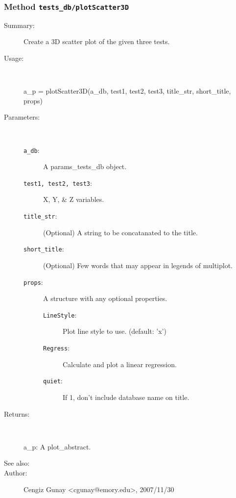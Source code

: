 \subsubsection[Method \texttt{plotScatter3D}]{Method \texttt{tests\_db/plotScatter3D}}%
%
\label{ref_tests_db__plotScatter3D}%
\hypertarget{ref_tests_db__plotScatter3D}{}%
\begin{description}
\item[Summary:]Create a 3D scatter plot of the given three tests.
%
\item[Usage:]~%
\begin{lyxcode}%
a\_p = plotScatter3D(a\_db, test1, test2, test3, title\_str, short\_title, props)
%
\end{lyxcode}%
%
%
\item[Parameters:]~
\begin{description}%
\item[\texttt{a\_db}:]
 A params\_tests\_db object.
\item[\texttt{test1, test2, test3}:]
 X, Y, \& Z variables.
\item[\texttt{title\_str}:]
 (Optional) A string to be concatanated to the title.
\item[\texttt{short\_title}:]
 (Optional) Few words that may appear in legends of multiplot.
\item[\texttt{props}:]
 A structure with any optional properties.
\begin{description}%
\item[\texttt{LineStyle}:]
 Plot line style to use. (default: 'x')
\item[\texttt{Regress}:]
 Calculate and plot a linear regression.
\item[\texttt{quiet}:]
 If 1, don't include database name on title.
\end{description}%
\end{description}%
%
\item[Returns:
]~

	a\_p: A plot\_abstract.
%
%
\item[See also:]%
%
\item[Author:]%
Cengiz Gunay <cgunay@emory.edu>, 2007/11/30
%
\end{description}
\methodline%
